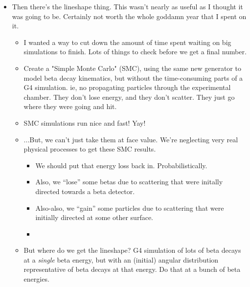 



\begin{itemize}
	\item Then there's the lineshape thing.  This wasn't nearly as useful as I thought it was going to be.  Certainly not worth the whole goddamn year that I spent on it.
	\begin{itemize}
		\item I wanted a way to cut down the amount of time spent waiting on big simulations to finish.  Lots of things to check before we get a final number.
		\item Create a "Simple Monte Carlo" (SMC), using the same new generator to model beta decay kinematics, but without the time-consuming parts of a G4 simulation.  ie, no propagating particles through the experimental chamber.  They don't lose energy, and they don't scatter.  They just go where they were going and hit.  
		\item SMC simulations run nice and fast!  Yay!
		\item ...But, we can't just take them at face value.  We're neglecting very real physical processes to get these SMC results.  
		\begin{itemize}
			\item We should put that energy loss back in.  Probabilistically.
			\item Also, we ``lose'' some betas due to scattering that were initally directed towards a beta detector.  
			\item Also-also, we ``gain'' some particles due to scattering that were initially directed at some other surface.  
			\item {}
		\end{itemize}
		\item But where do we get the lineshape?  G4 simulation of lots of beta decays at a \emph{single} beta energy, but with an (initial) angular distribution representative of beta decays at that energy.  Do that at a bunch of beta energies.

\end{itemize}
\end{itemize}
